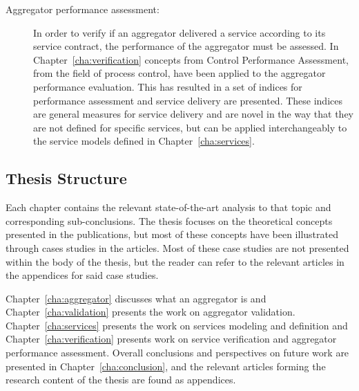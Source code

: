 \begin{description}
	\item[Aggregator performance assessment:] In order to verify if an aggregator delivered a service according to its service contract, the performance of the aggregator must be assessed. In Chapter~\ref{cha:verification} concepts from Control Performance Assessment, \ie from the field of process control, have been applied to the aggregator performance evaluation. This has resulted in a set of indices for performance assessment and service delivery are presented. These indices are general measures for service delivery and are novel in the way that they are not defined for specific services, but can be applied interchangeably to the service models defined in Chapter~\ref{cha:services}.
\end{description}

\subsection*{Thesis Structure}
Each chapter contains the relevant state-of-the-art analysis to that topic and corresponding sub-conclusions. The thesis focuses on the theoretical concepts presented in the publications, but most of these concepts have been illustrated through cases studies in the articles. Most of these case studies are not presented within the body of the thesis, but the reader can refer to the relevant articles in the appendices for said case studies.

Chapter~\ref{cha:aggregator} discusses what an aggregator is and Chapter~\ref{cha:validation} presents the work on aggregator validation. Chapter~\ref{cha:services} presents the work on services modeling and definition and Chapter~\ref{cha:verification} presents work on service verification and aggregator performance assessment. Overall conclusions and perspectives on future work are presented in Chapter~\ref{cha:conclusion}, and the relevant articles forming the research content of the thesis are found as appendices. 




